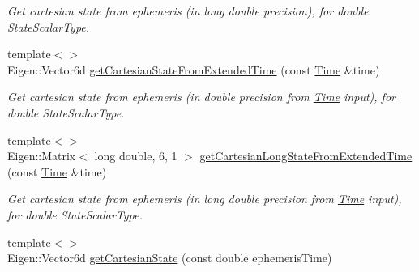 \begin{DoxyCompactItemize}
\begin{DoxyCompactList}\small\item\em Get cartesian state from ephemeris (in long double precision), for double State\+Scalar\+Type. \end{DoxyCompactList}\item 
{\footnotesize template$<$$>$ }\\Eigen\+::\+Vector6d \hyperlink{classtudat_1_1ephemerides_1_1TabulatedCartesianEphemeris_a6ed4d92c8dc87dc9f18c95538aa1dd30}{get\+Cartesian\+State\+From\+Extended\+Time} (const \hyperlink{classtudat_1_1Time}{Time} \&time)\hypertarget{classtudat_1_1ephemerides_1_1TabulatedCartesianEphemeris_a6ed4d92c8dc87dc9f18c95538aa1dd30}{}\label{classtudat_1_1ephemerides_1_1TabulatedCartesianEphemeris_a6ed4d92c8dc87dc9f18c95538aa1dd30}

\begin{DoxyCompactList}\small\item\em Get cartesian state from ephemeris (in double precision from \hyperlink{classtudat_1_1Time}{Time} input), for double State\+Scalar\+Type. \end{DoxyCompactList}\item 
{\footnotesize template$<$$>$ }\\Eigen\+::\+Matrix$<$ long double, 6, 1 $>$ \hyperlink{classtudat_1_1ephemerides_1_1TabulatedCartesianEphemeris_a07ef2071694a551c9157e7a1c9ee0319}{get\+Cartesian\+Long\+State\+From\+Extended\+Time} (const \hyperlink{classtudat_1_1Time}{Time} \&time)\hypertarget{classtudat_1_1ephemerides_1_1TabulatedCartesianEphemeris_a07ef2071694a551c9157e7a1c9ee0319}{}\label{classtudat_1_1ephemerides_1_1TabulatedCartesianEphemeris_a07ef2071694a551c9157e7a1c9ee0319}

\begin{DoxyCompactList}\small\item\em Get cartesian state from ephemeris (in long double precision from \hyperlink{classtudat_1_1Time}{Time} input), for double State\+Scalar\+Type. \end{DoxyCompactList}\item 
{\footnotesize template$<$$>$ }\\Eigen\+::\+Vector6d \hyperlink{classtudat_1_1ephemerides_1_1TabulatedCartesianEphemeris_a7a24cf887cd69499572de80a5be9b57d}{get\+Cartesian\+State} (const double ephemeris\+Time)\hypertarget{classtudat_1_1ephemerides_1_1TabulatedCartesianEphemeris_a7a24cf887cd69499572de80a5be9b57d}{}\label{classtudat_1_1ephemerides_1_1TabulatedCartesianEphemeris_a7a24cf887cd69499572de80a5be9b57d}


\end{DoxyCompactItemize}

